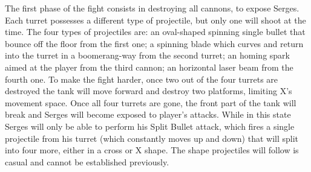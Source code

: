 The first phase of the fight consists in destroying all cannons, to expose Serges. Each turret possesses a different type of projectile, but only one will shoot at the time. The four types of projectiles are: an oval-shaped spinning single bullet that bounce off the floor from the first one; a spinning blade which curves and return into the turret in a boomerang-way from the second turret; an homing spark aimed at the player from the third cannon; an horizontal laser beam from the fourth one. To make the fight harder, once two out of the four turrets are destroyed the tank will move forward and destroy two platforms, limiting X's movement space. Once all four turrets are gone, the front part of the tank will break and Serges will become exposed to player's attacks. While in this state Serges will only be able to perform his Split Bullet attack, which fires a single projectile from his turret (which constantly moves up and down) that will split into four more, either in a cross or X shape. The shape projectiles will follow is casual and cannot be established previously.

